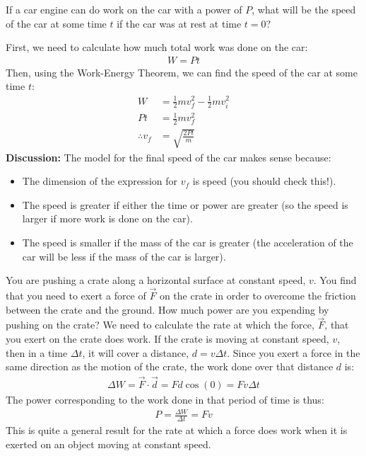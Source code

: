 \begin{example}{If a car engine can do work on the car with a power of $P$, what will be the speed of the car at some time $t$ if the car was at rest at time $t=0$?}

First, we need to calculate how much total work was done on the car:
\begin{align*}
W = P t
\end{align*}
Then, using the Work-Energy Theorem, we can find the speed of the car at some time $t$:
\begin{align*}
W &= \frac{1}{2}mv_f^2 - \frac{1}{2}mv_i^2\\
Pt &= \frac{1}{2}mv_f^2 \\
\therefore v_f &= \sqrt{\frac{2Pt}{m}}
\end{align*}
\textbf{Discussion:} The model for the final speed of the car makes sense because:
\begin{itemize}
\item The dimension of the expression for $v_f$ is speed (you should check this!).
\item The speed is greater if either the time or power are greater (so the speed is larger if more work is done on the car).
\item The speed is smaller if the mass of the car is greater (the acceleration of the car will be less if the mass of the car is larger).
\end{itemize}
\end{example}

\begin{example}{\label{ex:workenergy:powerconstantv}You are pushing a crate along a horizontal surface at constant speed, $v$. You find that you need to exert a force of $\vec F$ on the crate in order to overcome the friction between the crate and the ground. How much power are you expending by pushing on the crate?}
We need to calculate the rate at which the force, $\vec F$, that you exert on the crate does work. If the crate is moving at constant speed, $v$, then in a time $\Delta t$, it will cover a distance, $d=v\Delta t$. Since you exert a force in the same direction as the motion of the crate, the work done over that distance $d$ is:
\begin{align*}
\Delta W = \vec F \cdot \vec d = Fd\cos(0) = Fv\Delta t
\end{align*}
The power corresponding to the work done in that period of time is thus:
\begin{align*}
P = \frac{\Delta W}{\Delta t} = Fv
\end{align*}
This is quite a general result for the rate at which a force does work when it is exerted on an object moving at constant speed. 
\end{example}

